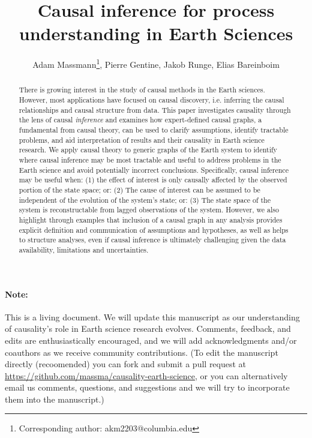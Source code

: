 \documentclass[12pt]{article}
\begin{document}
\title{Causal inference for process understanding in Earth Sciences}

\author{Adam Massmann\thanks{Corresponding author:
    akm2203@columbia.edu}, Pierre Gentine, Jakob Runge, Elias Bareinboim}

\maketitle
\begin{abstract}
  There is growing interest in the study of causal methods in the
  Earth sciences. However, most applications have focused on causal
  discovery, i.e. inferring the causal relationships and causal
  structure from data. This paper investigates causality through the
  lens of causal {\it inference} and examines how expert-defined
  causal graphs, a fundamental from causal theory, can be used to
  clarify assumptions, identify tractable problems, and aid
  interpretation of results and their causality in Earth science
  research. We apply causal theory to generic graphs of the Earth
  system to identify where causal inference may be most tractable and
  useful to address problems in the Earth science and avoid
  potentially incorrect conclusions. Specifically, causal inference
  may be useful when: (1) the effect of interest is only causally
  affected by the observed portion of the state space; or: (2) The
  cause of interest can be assumed to be independent of the evolution
  of the system’s state; or: (3) The state space of the system is
  reconstructable from lagged observations of the system. However, we
  also highlight through examples that inclusion of a causal graph in
  any analysis provides explicit definition and communication of
  assumptions and hypotheses, as well as helps to structure analyses,
  even if causal inference is ultimately challenging given the data
  availability, limitations and uncertainties.
\end{abstract}

\paragraph{Note:} This is a living document. We will update this
manuscript as our understanding of causality's role in Earth science
research evolves. Comments, feedback, and edits are enthusiastically
encouraged, and we will add acknowledgments and/or coauthors as we
receive community contributions. (To edit the manuscript directly
(recoomended) you can fork and submit a pull request at
\url{https://github.com/massma/causality-earth-science}, or you can
alternatively email us comments, questions, and suggestions and we
will try to incorporate them into the manuscript.)
\end{document}
